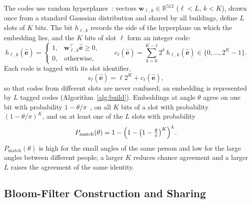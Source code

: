 \documentclass[pdflatex,sn-mathphys-num]{sn-jnl}%
\theoremstyle{thmstyleone}%
\theoremstyle{thmstyletwo}%
\theoremstyle{thmstylethree}%
\begin{document}
The codes use random hyperplanes~\cite{charikar2002}: vectors $\mathbf{w}_{\ell,k}\in\mathbb{R}^{512}$ ($\ell<L$, $k<K$), drawn once from a standard Gaussian distribution and shared by all buildings, define $L$ slots of $K$ bits. The bit $h_{\ell,k}$ records the side of the hyperplane on which the embedding lies, and the $K$ bits of slot $\ell$ form an integer code:
\begin{equation}
    h_{\ell,k}(\hat{\mathbf{e}}) =
    \begin{cases}
        1, & \mathbf{w}_{\ell,k}^\top\hat{\mathbf{e}} \geq 0,\\
        0, & \text{otherwise},
    \end{cases}
    \qquad
    c_\ell(\hat{\mathbf{e}}) = \sum_{k=0}^{K-1} 2^{k}\, h_{\ell,k}(\hat{\mathbf{e}}) \in \{0,\ldots,2^K-1\}.
    \label{eq:lsh_bit}
\end{equation}
Each code is tagged with its slot identifier,
\begin{equation}
    s_\ell(\hat{\mathbf{e}})
    =
    \ell 2^K + c_\ell(\hat{\mathbf{e}}),
    \label{eq:tagged_code}
\end{equation}
so that codes from different slots are never confused; an embedding is represented by $L$ tagged codes (Algorithm~\ref{alg:build}). Embeddings at angle $\theta$ agree on one bit with probability $1-\theta/\pi$~\cite{charikar2002}, on all $K$ bits of a slot with probability $(1-\theta/\pi)^K$, and on at least one of the $L$ slots with probability
\begin{equation}
    P_{\mathrm{match}}(\theta)=1-\Bigl(1-\bigl(1-\tfrac{\theta}{\pi}\bigr)^{K}\Bigr)^{L}.
    \label{eq:slot_agreement}
\end{equation}
$P_{\mathrm{match}}(\theta)$ is high for the small angles of the same person and low for the large angles between different people; a larger $K$ reduces chance agreement and a larger $L$ raises the agreement of the same identity.

\subsection{Bloom-Filter Construction and Sharing}
\label{subsec:bloom_filter}
\end{document}
